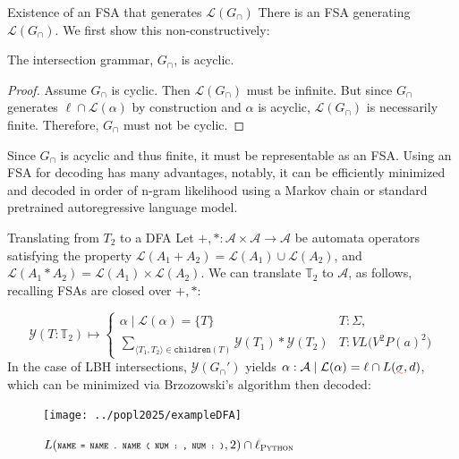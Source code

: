 \documentclass{beamer}
\begin{document}
\begin{frame}[fragile]{Existence of an FSA that generates $\mathcal{L}(G_\cap)$}
There is an FSA generating $\mathcal{L}(G_\cap)$. We first show this non-constructively:

\begin{lemma}\label{lemma:upper-bound}
The intersection grammar, $G_\cap$, is acyclic.
\end{lemma}

\begin{proof}
Assume $G_\cap$ is cyclic. Then $\mathcal{L}(G_\cap)$ must be infinite. But since $G_\cap$ generates $\ell \cap \mathcal{L}(\alpha)$ by construction and $\alpha$ is acyclic, $\mathcal{L}(G_\cap)$ is necessarily finite. Therefore, $G_\cap$ must not be cyclic.
\end{proof}

Since $G_\cap$ is acyclic and thus finite, it must be representable as an FSA. Using an FSA for decoding has many advantages, notably, it can be efficiently minimized and decoded in order of n-gram likelihood using a Markov chain or standard pretrained autoregressive language model.
\end{frame}

\begin{frame}[fragile]{Translating from $T_2$ to a DFA}
Let $+, *: \mathcal{A}\times \mathcal{A} \rightarrow \mathcal{A}$ be automata operators satisfying the property $\mathcal{L}(A_1 + A_2) = \mathcal{L}(A_1)\cup\mathcal{L}(A_2)$, and $\mathcal{L}(A_1 * A_2) = \mathcal{L}(A_1)\times\mathcal{L}(A_2)$. We can translate $\mathbb{T}_2$ to $\mathcal{A}$, as follows, recalling FSAs are closed over $+, *$:

\begin{equation*}
\mathcal{Y}(T:\mathbb{T}_2) \mapsto \begin{cases}
\alpha \mid \mathcal{L}(\alpha) = \{T\} & T: \Sigma, \\
\sum_{\langle T_1, T_2\rangle \in \texttt{children}(T)} \mathcal{Y}(T_1)*\mathcal{Y}(T_2) & T: VL\big(V^2P(a)^2\big)
\end{cases}
\end{equation*}
%
In the case of LBH intersections, $\mathcal{Y}(G_\cap')$ yields $\alpha: \mathcal{A} \mid \mathcal{L}(\alpha) = \ell\cap L(\err\sigma, d)$, which can be minimized via Brzozowski's algorithm then decoded:

\begin{figure}[H]
\centering
\texttt{[image: ../popl2025/exampleDFA]}
\caption{$L(\scriptsize{\texttt{NAME = NAME . NAME ( NUM : , NUM : )}}, 2) \cap \ell_\textsc{Python}$}
\end{figure}
\end{frame}
\end{document}
